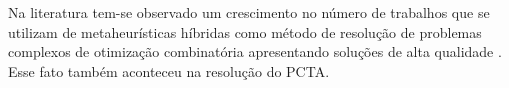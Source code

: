 Na literatura tem-se observado um crescimento no número de trabalhos que se
utilizam de metaheurísticas híbridas como método de resolução de problemas
complexos de otimização combinatória apresentando soluções de alta qualidade
. Esse fato também aconteceu na resolução do PCTA.






	
